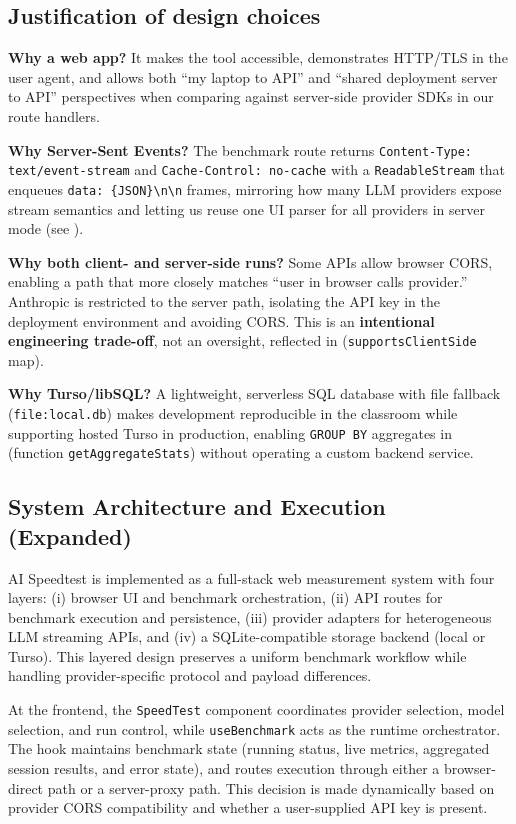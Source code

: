 \documentclass[11pt, a4paper]{article}
\begin{document}
\subsection{Justification of design choices}
\textbf{Why a web app?} It makes the tool accessible, demonstrates HTTP/TLS in the user agent, and allows both ``my laptop to API'' and ``shared deployment server to API'' perspectives when comparing against server-side provider SDKs in our route handlers.

\textbf{Why Server-Sent Events?} The benchmark route returns \texttt{Content-Type: text/event-stream} and \texttt{Cache-Control: no-cache} with a \texttt{ReadableStream} that enqueues \texttt{data: \{JSON\}\textbackslash n\textbackslash n} frames, mirroring how many LLM providers expose stream semantics and letting us reuse one UI parser for all providers in server mode (see ).

\textbf{Why both client- and server-side runs?} Some APIs allow browser CORS, enabling a path that more closely matches ``user in browser calls provider.'' Anthropic is restricted to the server path, isolating the API key in the deployment environment and avoiding CORS. This is an \textbf{intentional engineering trade-off}, not an oversight, reflected in  (\texttt{supportsClientSide} map).

\textbf{Why Turso/libSQL?} A lightweight, serverless SQL database with file fallback (\texttt{file:local.db}) makes development reproducible in the classroom while supporting hosted Turso in production, enabling \texttt{GROUP BY} aggregates in  (function \texttt{getAggregateStats}) without operating a custom backend service.

\subsection{System Architecture and Execution (Expanded)}

AI Speedtest is implemented as a full-stack web measurement system with four layers: (i) browser UI and benchmark orchestration, (ii) API routes for benchmark execution and persistence, (iii) provider adapters for heterogeneous LLM streaming APIs, and (iv) a SQLite-compatible storage backend (local or Turso). This layered design preserves a uniform benchmark workflow while handling provider-specific protocol and payload differences.

At the frontend, the \texttt{SpeedTest} component coordinates provider selection, model selection, and run control, while \texttt{useBenchmark} acts as the runtime orchestrator. The hook maintains benchmark state (running status, live metrics, aggregated session results, and error state), and routes execution through either a browser-direct path or a server-proxy path. This decision is made dynamically based on provider CORS compatibility and whether a user-supplied API key is present.
\end{document}
